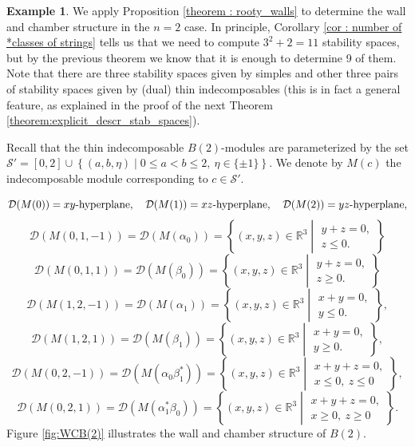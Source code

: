 \documentclass[11pt]{amsart}
\theoremstyle{definition}
\newtheorem{example}[theorem]{Example}
\begin{document}
\begin{example}
We apply Proposition \ref{theorem : rooty_walls}  to determine the wall and chamber structure in the $n=2$ case. In principle, Corollary \ref{cor : number of *classes of strings} tells us that we need to compute $3^2+2=11$ stability spaces, but by the previous theorem we know that it is enough to determine 9 of them. Note that there are three stability spaces given by simples and other three pairs of stability spaces given by (dual) thin indecomposables (this is in fact a general feature, as explained in  the proof of the next Theorem \ref{theorem:explicit_descr_stab_spaces}).

 Recall that the thin indecomposable $B(2)$-modules are parameterized by the set $\mathscr{S}'=[0,2]\cup\left\{(a,b,\eta)\mid 0\leq a<b\leq 2,\   \eta\in\{\pm 1\}\right\}$. We denote by $M(c)$ the indecomposable module corresponding to $c\in \mathscr{S}'$.
 
\[
\mathcal{D}(M(0))= xy\hbox{-hyperplane}, \quad \mathcal{D}(M(1))= xz\hbox{-hyperplane}, \quad \mathcal{D}(M(2))= yz\hbox{-hyperplane}, 
\]
\[
\mathcal{D}(M(0,1,-1))= \mathcal{D}(M(\alpha_0))= \left\{
(x,y,z)\in\mathbb{R
}^3 \middle\vert \begin{array}{l}
y+z=0,  \\
z\leq 0. 
\end{array}\right\}
\]
\[
\mathcal{D}(M(0,1,1))= \mathcal{D}(M(\beta_0)) = \left\{
(x,y,z)\in\mathbb{R
}^3\middle\vert \begin{array}{l}
y+z=0,  \\
z\geq 0. 
\end{array}\right\}
\]
\[
\mathcal{D}(M(1,2,-1))= \mathcal{D}(M(\alpha_1)) =\left\{
(x,y,z)\in\mathbb{R
}^3\middle\vert \begin{array}{l}
x+y=0,  \\
y\leq 0. 
\end{array}\right\},
\]
\[
\mathcal{D}(M(1,2,1))= \mathcal{D}(M(\beta_1)) =\left\{
(x,y,z)\in\mathbb{R
}^3\middle\vert \begin{array}{l}
x+y=0,  \\
y\geq 0. 
\end{array}\right\},
\]
\[
\mathcal{D}(M(0,2,-1))= \mathcal{D}(M(\alpha_0\beta_1^*)) = \left\{
(x,y,z)\in\mathbb{R
}^3\middle\vert \begin{array}{l}
x+y+z=0,  \\
x\leq 0, \ z\leq 0
\end{array}\right\},
\]
\[
\mathcal{D}(M(0,2,1))= \mathcal{D}(M(\alpha_1^*\beta_0)) = \left\{
(x,y,z)\in\mathbb{R
}^3\middle\vert \begin{array}{l}
x+y+z=0,  \\
x\geq 0, \ z\geq 0
\end{array}\right\}.
\]
 Figure \ref{fig:WCB(2)} illustrates the wall and chamber structure of $B(2)$.
 

\end{example}
\end{document}
